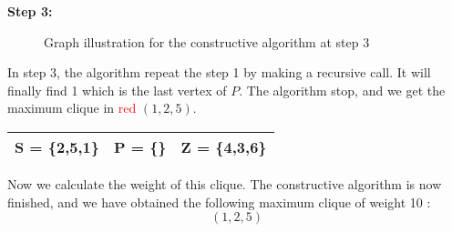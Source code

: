 \vspace{1\baselineskip}

\begin{minipage}{\linewidth}
    \textbf{Step 3:}

    \begin{minipage}{0.4\textwidth}
        \begin{figure}[H]
            \centering
            \caption{Graph illustration for the constructive algorithm at step 3}
            \label{fig:constructive-mewc-edge-step3}
        \end{figure}
    \end{minipage}
    \hspace{0.04\linewidth}
    \begin{minipage}{0.55\textwidth}
        In step 3, the algorithm repeat the step 1 by making a recursive call. It will finally find 1 which is the last vertex of $P$. The algorithm stop, and we get the maximum clique in \textcolor{red}{red} $(1,2,5)$.

        \begin{center}
            \begin{tabular}{|lll|}
                \hline
                S = \{2,5,1\} & P = \{\} & Z = \{4,3,6\} \\
                \hline
            \end{tabular}
        \end{center}
    \end{minipage}
\end{minipage}


\vspace{1\baselineskip}

Now we calculate the weight of this clique. The constructive algorithm is now finished, and we have obtained the following maximum clique of weight 10 : $$(1,2,5)$$

\newpage

